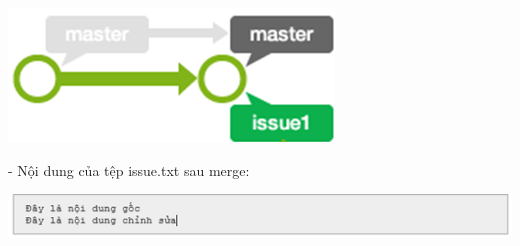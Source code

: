 \documentclass[12pt,a4paper]{report}
\begin{document}
\begin{itemize}
	\label{fig:screenshot01}

	\includegraphics[width=0.8\linewidth]{screenshot062}

	\label{fig:screenshot062}

- Nội dung của tệp issue.txt sau merge:	

\includegraphics[width=0.8\linewidth]{screenshot02}

	\label{fig:screenshot02}

\end{itemize}
\end{document}
